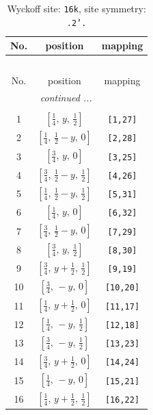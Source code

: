 \documentclass[fleqn,8pt]{jsarticle}
\begin{document}
\renewcommand{\arraystretch}{1.2}
\begin{longtable}{ccc}
\caption{Wyckoff site: {\tt 16k}, site symmetry: {\tt .2'.}}
 \\
 \hline \hline
No. & position & mapping \\ \hline \endfirsthead

\multicolumn{2}{l}{\tablename\ \thetable{}} \\
 \hline \hline
No. & position & mapping \\ \hline \endhead

 \hline \hline
\multicolumn{2}{r}{\footnotesize\it continued ...} \\ \endfoot

 \hline \hline
\multicolumn{2}{r}{} \\ \endlastfoot

1 & $\left[ \frac{1}{4},\, y,\, \frac{1}{2} \right]$ & {\tt [1,27]} \\ \hline
2 & $\left[ \frac{1}{4},\, \frac{1}{2} - y,\, 0 \right]$ & {\tt [2,28]} \\ \hline
3 & $\left[ \frac{3}{4},\, y,\, 0 \right]$ & {\tt [3,25]} \\ \hline
4 & $\left[ \frac{3}{4},\, \frac{1}{2} - y,\, \frac{1}{2} \right]$ & {\tt [4,26]} \\ \hline
5 & $\left[ \frac{1}{4},\, \frac{1}{2} - y,\, \frac{1}{2} \right]$ & {\tt [5,31]} \\ \hline
6 & $\left[ \frac{1}{4},\, y,\, 0 \right]$ & {\tt [6,32]} \\ \hline
7 & $\left[ \frac{3}{4},\, \frac{1}{2} - y,\, 0 \right]$ & {\tt [7,29]} \\ \hline
8 & $\left[ \frac{3}{4},\, y,\, \frac{1}{2} \right]$ & {\tt [8,30]} \\ \hline
9 & $\left[ \frac{3}{4},\, y + \frac{1}{2},\, \frac{1}{2} \right]$ & {\tt [9,19]} \\ \hline
10 & $\left[ \frac{3}{4},\, - y,\, 0 \right]$ & {\tt [10,20]} \\ \hline
11 & $\left[ \frac{1}{4},\, y + \frac{1}{2},\, 0 \right]$ & {\tt [11,17]} \\ \hline
12 & $\left[ \frac{1}{4},\, - y,\, \frac{1}{2} \right]$ & {\tt [12,18]} \\ \hline
13 & $\left[ \frac{3}{4},\, - y,\, \frac{1}{2} \right]$ & {\tt [13,23]} \\ \hline
14 & $\left[ \frac{3}{4},\, y + \frac{1}{2},\, 0 \right]$ & {\tt [14,24]} \\ \hline
15 & $\left[ \frac{1}{4},\, - y,\, 0 \right]$ & {\tt [15,21]} \\ \hline
16 & $\left[ \frac{1}{4},\, y + \frac{1}{2},\, \frac{1}{2} \right]$ & {\tt [16,22]} \\
\end{longtable}
\end{document}
